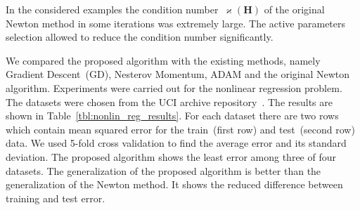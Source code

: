 \documentclass[a4paper,12pt]{article}
\renewcommand{\kappa}{\ensuremath{\varkappa}}
\theoremstyle{plain} %
\theoremstyle{definition} %
\theoremstyle{remark} %
\newcommand{\bH}{\mathbf{H}}
\begin{document}
In the considered examples the condition number~$\kappa (\bH)$ of the original Newton method in some iterations was extremely large. 
The active parameters selection allowed to reduce the condition number significantly. 

We compared the proposed algorithm with the existing methods, namely Gradient Descent~(GD), Nesterov Momentum, ADAM and the original Newton algorithm. 
Experiments were carried out for the nonlinear regression problem. 
The datasets were chosen from the UCI archive repository~\cite{uci2017}. 
The results are shown in Table~\ref{tbl:nonlin_reg_results}. 
For each dataset there are two rows which contain mean squared error for the train~(first row) and test~(second row) data. 
We used 5-fold cross validation to find the average error and its standard deviation. 
The proposed algorithm shows the least error among three of four datasets. 
The generalization of the proposed algorithm is better than the generalization of the Newton method. 
It shows the reduced difference between training and test error.
\end{document}
